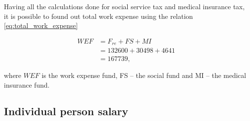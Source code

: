 Having all the calculations done for social service tax and medical insurance tax, it is possible to found out total work expense using the relation \eqref{eq:total_work_expense}

\begin{equation}\label{eq:total_work_expense}
\begin{split}
 WEF &= F_{re} + FS + MI\\
     &= 132600 + 30498 + 4641\\
     &= 167739,
\end{split}
\end{equation}

\noindent
where $WEF$ is the work expense fund, FS -- the social fund and MI -- the medical insurance fund.

\subsection{Individual person salary}




